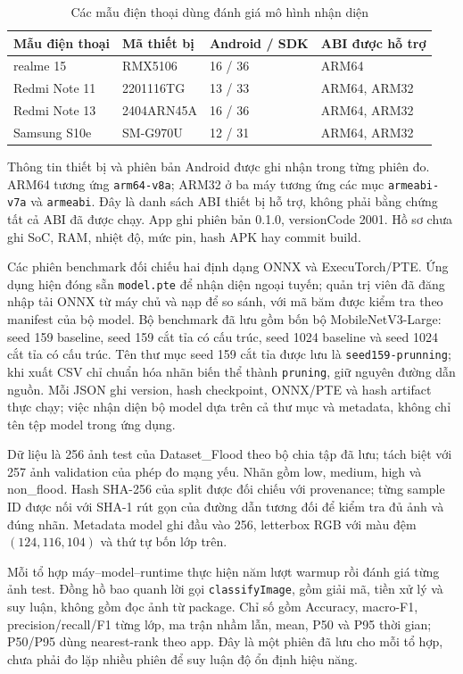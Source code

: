 \begin{table}[htbp]\centering
\caption{Các mẫu điện thoại dùng đánh giá mô hình nhận diện}
\label{tab:phone-benchmark-devices}
\begin{tabular}{P{.27\textwidth}P{.24\textwidth}P{.18\textwidth}P{.18\textwidth}}
\toprule Mẫu điện thoại & Mã thiết bị & Android / SDK & ABI được hỗ trợ \\
\midrule
realme 15 & RMX5106 & 16 / 36 & ARM64 \\
Redmi Note 11 & 2201116TG & 13 / 33 & ARM64, ARM32 \\
Redmi Note 13 & 2404ARN45A & 16 / 36 & ARM64, ARM32 \\
Samsung S10e & SM-G970U & 12 / 31 & ARM64, ARM32 \\
\bottomrule
\end{tabular}
\end{table}
Thông tin thiết bị và phiên bản Android được ghi nhận trong từng phiên đo. ARM64 tương ứng \texttt{arm64-v8a}; ARM32 ở ba máy tương ứng các mục \texttt{armeabi-v7a} và \texttt{armeabi}. Đây là danh sách ABI thiết bị hỗ trợ, không phải bằng chứng tất cả ABI đã được chạy. App ghi phiên bản 0.1.0, versionCode 2001. Hồ sơ chưa ghi SoC, RAM, nhiệt độ, mức pin, hash APK hay commit build.

Các phiên benchmark đối chiếu hai định dạng ONNX và ExecuTorch/PTE. Ứng dụng hiện đóng sẵn \texttt{model.pte} để nhận diện ngoại tuyến; quản trị viên đã đăng nhập tải ONNX từ máy chủ và nạp để so sánh, với mã băm được kiểm tra theo manifest của bộ model. Bộ benchmark đã lưu gồm bốn bộ MobileNetV3-Large: seed 159 baseline, seed 159 cắt tỉa có cấu trúc, seed 1024 baseline và seed 1024 cắt tỉa có cấu trúc. Tên thư mục seed 159 cắt tỉa được lưu là \texttt{seed159-prunning}; khi xuất CSV chỉ chuẩn hóa nhãn biến thể thành \texttt{pruning}, giữ nguyên đường dẫn nguồn. Mỗi JSON ghi version, hash checkpoint, ONNX/PTE và hash artifact thực chạy; việc nhận diện bộ model dựa trên cả thư mục và metadata, không chỉ tên tệp model trong ứng dụng.

Dữ liệu là 256 ảnh test của Dataset\_Flood theo bộ chia tập đã lưu; tách biệt với 257 ảnh validation của phép đo mạng yếu. Nhãn gồm low, medium, high và non\_flood. Hash SHA-256 của split được đối chiếu với provenance; từng sample ID được nối với SHA-1 rút gọn của đường dẫn tương đối để kiểm tra đủ ảnh và đúng nhãn. Metadata model ghi đầu vào 256, letterbox RGB với màu đệm $(124,116,104)$ và thứ tự bốn lớp trên.

Mỗi tổ hợp máy--model--runtime thực hiện năm lượt warmup rồi đánh giá từng ảnh test. Đồng hồ bao quanh lời gọi \texttt{classifyImage}, gồm giải mã, tiền xử lý và suy luận, không gồm đọc ảnh từ package. Chỉ số gồm Accuracy, macro-F1, precision/recall/F1 từng lớp, ma trận nhầm lẫn, mean, P50 và P95 thời gian; P50/P95 dùng nearest-rank theo app. Đây là một phiên đã lưu cho mỗi tổ hợp, chưa phải đo lặp nhiều phiên để suy luận độ ổn định hiệu năng.

